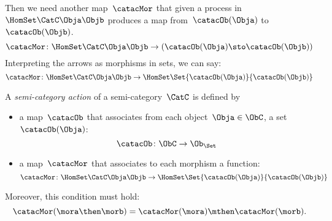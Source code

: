 Then we need another map~$\catacMor$ that given a process in~$\HomSet\CatC\Obja\Objb$
produces a map from~$\catacOb(\Obja)$ to~$\catacOb(\Objb)$.
%
\begin{equation}\label{eq:gamma-1}
  \catacMor\colon \HomSet\CatC\Obja\Objb \to  (\catacOb(\Obja) \sto \catacOb(\Objb))
\end{equation}
%
Interpreting the arrows as morphisms in sets, we can say:
\begin{equation}\label{eq:gamma-2}
  \catacMor\colon \HomSet\CatC\Obja\Objb \to  \HomSet\Set{\catacOb(\Obja)}{\catacOb(\Objb) }
\end{equation}

\begin{ctdefinition}\label{def:semicategory-action}
  A \emph{semi-category action} of a semi-category~$\CatC$ is defined by
  \begin{itemize}
    \item a map~$\catacOb$ that associates from each object~$\Obja \in \ObC$, a set~$\catacOb(\Obja)$:
    \begin{equation}
      \catacOb \colon \ObC \to \Ob_\Set
    \end{equation}
    \item a map~$\catacMor$ that associates to each morphism a function:
    \begin{equation}
      \catacMor\colon \HomSet\CatC\Obja\Objb \to  \HomSet\Set{\catacOb(\Obja)}{\catacOb(\Objb) }
    \end{equation}
  \end{itemize}
  Moreover, this condition must hold:
  \begin{equation}
    \catacMor(\mora\then\morb) = \catacMor(\mora) \mthen \catacMor(\morb).
  \end{equation}
\end{ctdefinition}